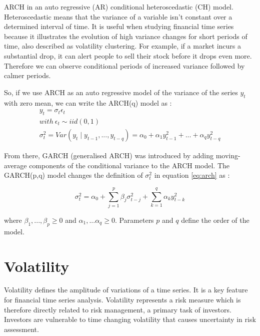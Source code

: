 \documentclass[11pt,a4paper,oneside]{book}
\begin{document}
ARCH in an auto regressive (AR) conditional heteroscedastic (CH) model. Heteroscedastic means that the variance of a variable isn't constant over a determined interval of time. It is useful when studying financial time series because it illustrates the evolution of high variance changes for short periods of time, also described as volatility clustering. For example, if a market incurs a substantial drop, it can alert people to sell their stock before it drops even more. Therefore we can observe conditional periods of increased variance followed by calmer periods. \cite{Holan}

So, if we use ARCH as an auto regressive model of the variance of the series $y_t$ with zero mean, we can write the ARCH(q) model as : 
\begin{equation}\label{eq:arch}
\begin{matrix}
y_t = \sigma_t \epsilon_t \\
with \ \epsilon_t \sim iid(0,1) \\
\sigma_t^2 = Var(y_t \mid y_{t-1},..., y_{t-q}) = \alpha_0 + \alpha_1 y_{t-1}^2 + ... + \alpha_q y_{t-q}^2
\end{matrix}
\end{equation}


From there, GARCH (generalised ARCH) was introduced by adding moving-average components of the conditional variance to the ARCH model. The GARCH(p,q) model changes the definition of $\sigma_t^2$ in equation \ref{eq:arch} as : 

\begin{equation}
\sigma_t^2 = \alpha_0 + \sum_{j=1}^p\beta_j \sigma_{t-j}^2 + \sum_{k=1}^q\alpha_k y_{t-k}^2 
\end{equation}

where $ \beta_1,..., \beta_p \geq 0$ and $\alpha_1,...\alpha_q \geq 0$. Parameters $p$ and $q$ define the order of the model. \cite{Holan}





\section{Volatility}

Volatility defines the amplitude of variations of a time series. It is a key feature for financial time series analysis. Volatility represents a risk measure which is therefore directly related to risk management, a primary task of investors. Investors are vulnerable to time changing volatility that causes uncertainty in risk assessment. 
\end{document}
